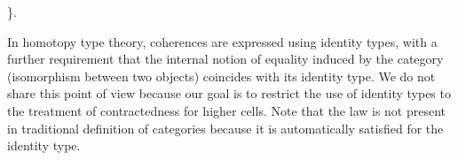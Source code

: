 \begin{coqdoccode}
\coqdocindent{7.00em}
               \}.\coqdoceol
\coqdocemptyline
\end{coqdoccode}
  In homotopy type theory, coherences are expressed using identity types, with a further requirement that the internal notion of equality induced by the category (isomorphism between two objects) coincides with its identity type.  
  We do not share this point of view because our goal is to restrict the use of identity types to the treatment of contractedness for higher cells. 
  Note that the  law is not present in traditional definition of categories 
  because it is automatically satisfied for the identity type.
\begin{coqdoccode}
\end{coqdoccode}


